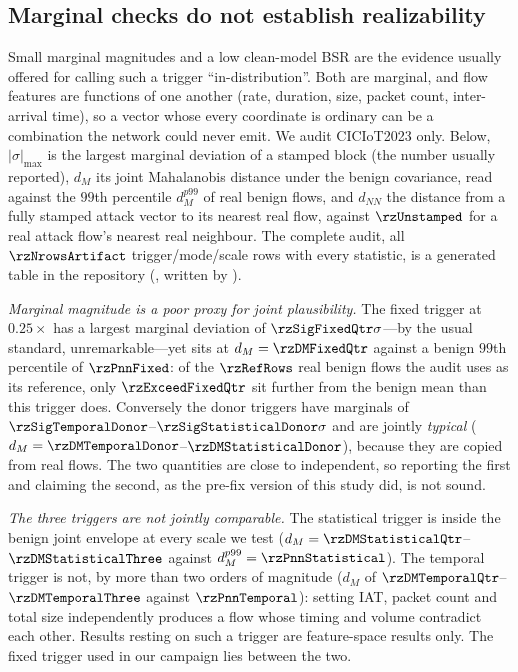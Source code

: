 \subsection*{Marginal checks do not establish realizability}

Small marginal magnitudes and a low clean-model BSR are the evidence usually
offered for calling such a trigger ``in-distribution''. Both are marginal, and flow
features are functions of one another (rate, duration, size, packet count,
inter-arrival time), so a vector whose every coordinate is ordinary can be a
combination the network could never emit. We audit CICIoT2023 only. Below, $|\sigma|_{\max}$ is the largest marginal
deviation of a stamped block (the number usually reported), $d_M$ its joint
Mahalanobis distance under the benign covariance, read against the $99$th
percentile $d_M^{p99}$ of real benign flows, and $d_{NN}$ the distance from a
fully stamped attack vector to its nearest real flow, against $\rzUnstamped$ for a
real attack flow's nearest real neighbour. The complete audit, all
$\rzNrowsArtifact$ trigger/mode/scale rows with every statistic, is a generated
table in the repository (,
written by ).

\emph{Marginal magnitude is a poor proxy for joint plausibility.} The fixed
trigger at $0.25\times$ has a largest marginal deviation of
$\rzSigFixedQtr\sigma$---by the usual standard, unremarkable---yet sits at
$d_M=\rzDMFixedQtr$ against a benign $99$th percentile of $\rzPnnFixed$: of the
$\rzRefRows$ real benign flows the audit uses as its reference, only
$\rzExceedFixedQtr$ sit further from the benign mean than this trigger does. Conversely the donor triggers have marginals of
$\rzSigTemporalDonor$--$\rzSigStatisticalDonor\sigma$ and are jointly
\emph{typical} ($d_M=\rzDMTemporalDonor$--$\rzDMStatisticalDonor$), because they are copied from
real flows. The two quantities are close to independent, so reporting the first
and claiming the second, as the pre-fix version of this study did, is not sound.

\emph{The three triggers are not jointly comparable.} The statistical trigger is
inside the benign joint envelope at every scale we test
($d_M=\rzDMStatisticalQtr$--$\rzDMStatisticalThree$ against
$d_M^{p99}=\rzPnnStatistical$). The temporal trigger is not, by more than two
orders of magnitude ($d_M$ of $\rzDMTemporalQtr$--$\rzDMTemporalThree$ against
$\rzPnnTemporal$): setting IAT, packet count and total size independently produces
a flow whose timing and volume contradict each other. Results resting on such a trigger are feature-space results only. The fixed trigger used in our campaign lies between the two.

